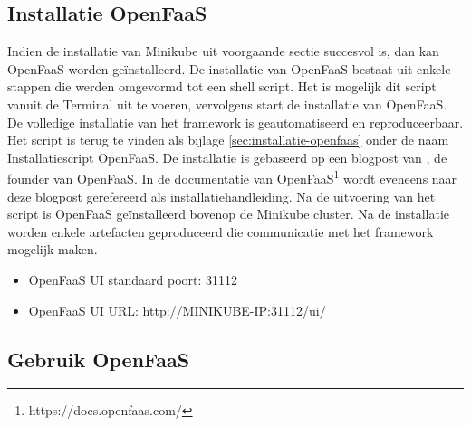 \subsection{Installatie OpenFaaS}
Indien de installatie van Minikube uit voorgaande sectie succesvol is, dan kan OpenFaaS worden geïnstalleerd. De installatie van OpenFaaS bestaat uit enkele stappen die werden omgevormd tot een shell script. Het is mogelijk dit script vanuit de Terminal uit te voeren, vervolgens start de installatie van OpenFaaS. De volledige installatie van het framework is geautomatiseerd en reproduceerbaar. Het script is terug te vinden als bijlage \ref{sec:installatie-openfaas} onder de naam Installatiescript OpenFaaS. De installatie is gebaseerd op een blogpost van \textcite{Ellis2017}, de founder van OpenFaaS. In de documentatie van OpenFaaS\footnote{https://docs.openfaas.com/} wordt eveneens naar deze blogpost gerefereerd als installatiehandleiding. Na de  uitvoering van het script is OpenFaaS geïnstalleerd bovenop de Minikube cluster. Na de installatie worden enkele artefacten geproduceerd die communicatie met het framework mogelijk maken.
\\
\begin{itemize}
    \item OpenFaaS UI standaard poort: 31112
    \item OpenFaaS UI URL: http://MINIKUBE-IP:31112/ui/
\end{itemize}
 
\subsection{Gebruik OpenFaaS}
